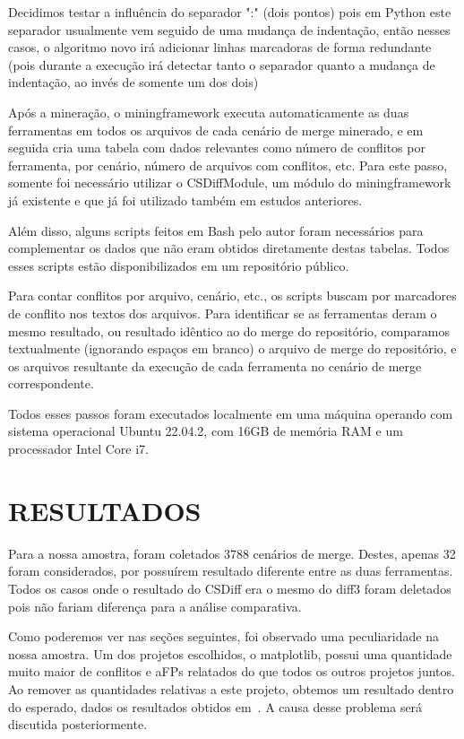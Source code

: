 Decidimos testar a influência do separador ":" (dois pontos) pois em Python este separador usualmente vem seguido de uma
mudança de indentação, então nesses casos, o algoritmo novo irá adicionar linhas marcadoras de forma redundante (pois
durante a execução irá detectar tanto o separador quanto a mudança de indentação, ao invés de somente um dos dois)

Após a mineração, o miningframework executa automaticamente as duas ferramentas em todos os arquivos de cada cenário de merge
minerado, e em seguida cria uma tabela com dados relevantes como número de conflitos por
ferramenta, por cenário, número de arquivos com conflitos, etc. Para este passo, somente foi necessário utilizar
o CSDiffModule, um módulo do miningframework já existente e que já foi utilizado também em estudos anteriores.

Além disso, alguns scripts feitos em Bash pelo autor foram necessários para complementar os dados que não eram obtidos
diretamente destas tabelas. Todos esses scripts estão disponibilizados em um repositório público. %

Para contar conflitos por arquivo,
cenário, etc., os scripts buscam por marcadores
de conflito nos textos dos arquivos. Para identificar se as ferramentas deram o mesmo resultado,
ou resultado idêntico ao do merge
do repositório, comparamos textualmente (ignorando espaços em
branco) o arquivo de merge do repositório, e os arquivos resultante da execução de cada
ferramenta no cenário de merge correspondente.

Todos esses passos foram executados localmente em uma máquina operando com sistema operacional Ubuntu 22.04.2,
com 16GB de memória
RAM e um processador Intel Core i7.

\section{RESULTADOS}
Para a nossa amostra, foram coletados 3788 cenários de merge. Destes, apenas 32 foram considerados, por possuírem resultado
diferente entre as duas ferramentas. Todos os casos onde o resultado do CSDiff era o mesmo do diff3
foram deletados pois não fariam
diferença para a análise comparativa.

Como poderemos ver nas seções seguintes, foi observado uma peculiaridade na nossa amostra. Um dos projetos escolhidos, o
matplotlib, possui uma quantidade muito maior de conflitos e aFPs relatados do que todos os outros projetos juntos. Ao remover
as quantidades relativas a este projeto, obtemos um resultado dentro do esperado, dados os resultados obtidos
em~\cite{clem21,heitor21}. A causa desse problema será discutida posteriormente.


